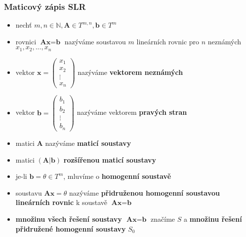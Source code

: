 \subsubsection*{Maticový zápis SLR}
\begin{itemize}
	\item nechť $m,n \in \mathbb{N}, \textbf{A} \in T^{m,n},\textbf{b} \in T^{m}$
	\item rovnici $\textbf{Ax} = \textbf{b}$ nazýváme soustavou $m$ lineárních rovnic pro $n$ neznámých $x_1, x_2,...,x_n$
	\item vektor $\textbf{x} = \begin{pmatrix} x_1\\ x_2\\ \vdots\\ x_n \end{pmatrix}$ nazýváme \textbf{vektorem neznámých}
	\item vektor $\textbf{b} = \begin{pmatrix} b_1\\ b_2\\ \vdots\\ b_n \end{pmatrix}$ nazýváme vektorem \textbf{pravých stran}
	\item matici $\textbf{A}$ nazýváme \textbf{maticí soustavy}
	\item matici $(\textbf{A} | \textbf{b})$ \textbf{rozšířenou maticí soustavy}
	\item je-li $\textbf{b} = \theta \in T^m$, mluvíme o \textbf{homogenní soustavě}
	\item soustavu $\textbf{Ax} = \theta$ nazýváme \textbf{přidruženou homogenní soustavou lineárních rovnic} k soustavě $\textbf{Ax} = \textbf{b}$
	\item \textbf{množinu všech řešení soustavy $\textbf{Ax} = \textbf{b}$} značíme $S$ a \textbf{množinu řešení přidružené homogenní soustavy} $S_0$
	
\end{itemize}

